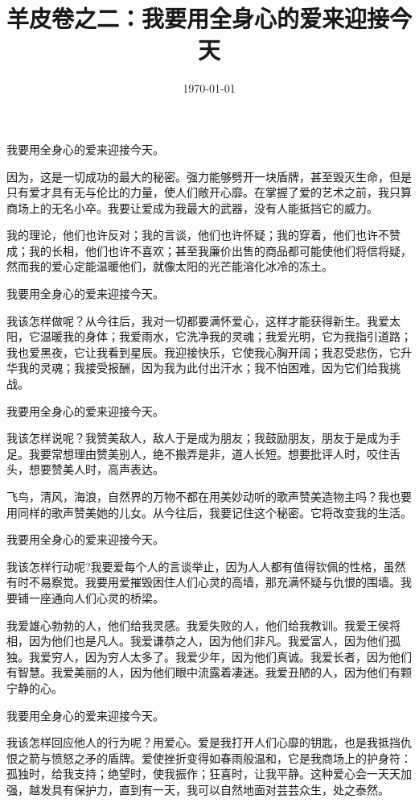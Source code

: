 \documentclass[UTF8,a5paper]{ctexart}
\title{羊皮卷之二：我要用全身心的爱来迎接今天}
\date{\today}
\begin{document}
\fangsong
\large
\maketitle

我要用全身心的爱来迎接今天。

因为，这是一切成功的最大的秘密。强力能够劈开一块盾牌，甚至毁灭生命，但是只有爱才具有无与伦比的力量，使人们敞开心靡。在掌握了爱的艺术之前，我只算商场上的无名小卒。我要让爱成为我最大的武器，没有人能抵挡它的威力。

我的理论，他们也许反对；我的言谈，他们也许怀疑；我的穿着，他们也许不赞成；我的长相，他们也许不喜欢；甚至我廉价出售的商品都可能使他们将信将疑，然而我的爱心定能温暖他们，就像太阳的光芒能溶化冰冷的冻土。

我要用全身心的爱来迎接今天。

我该怎样做呢？从今往后，我对一切都要满怀爱心，这样才能获得新生。我爱太阳，它温暖我的身体；我爱雨水，它洗净我的灵魂；我爱光明，它为我指引道路；我也爱黑夜，它让我看到星辰。我迎接快乐，它使我心胸开阔；我忍受悲伤，它升华我的灵魂；我接受报酬，因为我为此付出汗水；我不怕困难，因为它们给我挑战。

我要用全身心的爱来迎接今天。

我该怎样说呢？我赞美敌人，敌人于是成为朋友；我鼓励朋友，朋友于是成为手足。我要常想理由赞美别人，绝不搬弄是非，道人长短。想要批评人时，咬住舌头，想要赞美人时，高声表达。

飞鸟，清风，海浪，自然界的万物不都在用美妙动听的歌声赞美造物主吗？我也要用同样的歌声赞美她的儿女。从今往后，我要记住这个秘密。它将改变我的生活。

我要用全身心的爱来迎接今天。

我该怎样行动呢?我要爱每个人的言谈举止，因为人人都有值得钦佩的性格，虽然有时不易察觉。我要用爱摧毁困住人们心灵的高墙，那充满怀疑与仇恨的围墙。我要铺一座通向人们心灵的桥梁。

我爱雄心勃勃的人，他们给我灵感。我爱失败的人，他们给我教训。我爱王侯将相，因为他们也是凡人。我爱谦恭之人，因为他们非凡。我爱富人，因为他们孤独。我爱穷人，因为穷人太多了。我爱少年，因为他们真诚。我爱长者，因为他们有智慧。我爱美丽的人，因为他们眼中流露着凄迷。我爱丑陋的人，因为他们有颗宁静的心。

我要用全身心的爱来迎接今天。

我该怎样回应他人的行为呢？用爱心。爱是我打开人们心靡的钥匙，也是我抵挡仇恨之箭与愤怒之矛的盾牌。爱使挫折变得如春雨般温和，它是我商场上的护身符：孤独时，给我支持；绝望时，使我振作；狂喜时，让我平静。这种爱心会一天天加强，越发具有保护力，直到有一天，我可以自然地面对芸芸众生，处之泰然。
\end{document}
